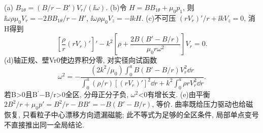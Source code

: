 \begin{solution}
(a) $B_{1\theta}=(B/r-B')V_r/(\ii\omega)$. (b)令 $H=B B_{1\theta}+\mu_0p_1$, 则 $\ii\omega\rho\mu_0V_r=-2BB_{1\theta}/r-H'$, $\ii\omega\rho\mu_0V_z=-\ii kH$. (c)不可压 $(rV_r)'/r+\ii kV_z=0$, 消H得到
\begin{equation}
 \left[\frac\rho r(rV_r)'\right]'
 -k^2\left[\rho+\frac{2B(B'-B/r)}{\mu_0r\omega^2}\right]V_r=0.
\end{equation}
(d)轴正规、壁Vr0使边界积分零, 对实径向试函数
\begin{equation}
 \omega^2=-\frac{(2k^2/\mu_0)\int_0^a B(B'-B/r)V_r^2\dd r}
 {\int_0^a(\rho/r)[(rV_r)']^2\dd r+k^2\int_0^a\rho rV_r^2\dd r}.
\end{equation}
若B>0且B\ensuremath{{}^{\prime}}\ensuremath{-}B/r>0全区, 分母正分子负, \ensuremath{\omega}\ensuremath{{}^{2}}<0有增长支. (e)由平衡 $2B^2/r+\mu_0p'=B^2/r-BB'=-B(B'-B/r)$, 等价. 曲率既给压力驱动也给磁恢复, 只看粒子中心漂移方向遗漏磁能; 此不等式为足够的全区条件, 局部单点变号不直接推出同一全局结论.
\end{solution}
